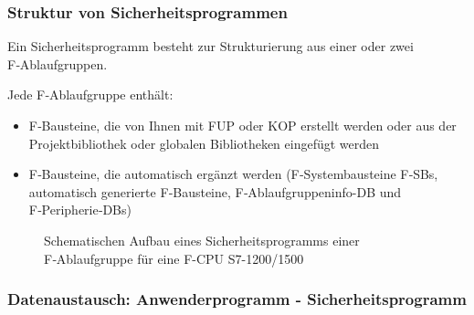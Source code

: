 \subsubsection{Struktur von Sicherheitsprogrammen}

Ein Sicherheitsprogramm besteht zur Strukturierung aus einer oder zwei F‑Ablaufgruppen. 

Jede F‑Ablaufgruppe enthält:

\begin{itemize}
    \item F‑Bausteine, die von Ihnen mit FUP oder KOP erstellt werden oder aus der Projektbibliothek oder globalen Bibliotheken eingefügt werden
    \item F‑Bausteine, die automatisch ergänzt werden (F‑Systembausteine F‑SBs, automatisch generierte F‑Bausteine, F‑Ablaufgruppeninfo-DB und F‑Peripherie‑DBs)
\end{itemize}

\begin{figure}[H]
   \centering
   \caption[Aufbau Sicherheitsprogramm]{Schematischen Aufbau eines Sicherheitsprogramms \bzw einer F‑Ablaufgruppe für eine F-CPU S7-1200/1500}
   \label{fig:Bild7.9}
\end{figure}

\clearpage

\subsubsection{Datenaustausch: Anwenderprogramm - Sicherheitsprogramm}

